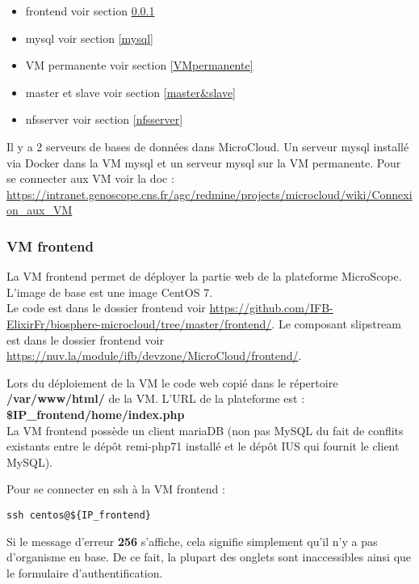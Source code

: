 \begin{itemize}
	\item frontend voir section \ref{frontend}
	\item mysql voir section \ref{mysql}
	\item VM permanente voir section \ref{VMpermanente}
	\item master et slave voir section \ref{master&slave}
	\item nfsserver voir section \ref{nfsserver}

\end{itemize}
Il y a 2 serveurs de bases de données dans MicroCloud. Un serveur mysql installé via Docker dans la VM mysql et un serveur mysql sur la VM permanente. Pour se connecter aux VM voir la doc : \url{https://intranet.genoscope.cns.fr/agc/redmine/projects/microcloud/wiki/Connexion_aux_VM}

\subsubsection {VM frontend}

\label{frontend} La VM frontend permet de déployer la partie web de la plateforme MicroScope. L'image de base est une image CentOS 7.\\
Le code est dans le dossier frontend voir \url{https://github.com/IFB-ElixirFr/biosphere-microcloud/tree/master/frontend/}.
Le composant slipstream est dans le dossier frontend voir \url{https://nuv.la/module/ifb/devzone/MicroCloud/frontend/}.

Lors du déploiement de la VM le code web copié dans le répertoire \textbf{/var/www/html/} de la VM.
L'URL de la plateforme est : \textbf{\$IP\_frontend/home/index.php}\\
La VM frontend possède un client mariaDB (non pas MySQL du fait de conflits existants entre le dépôt remi-php71 installé et le dépôt IUS qui fournit le client MySQL).
\newline

Pour se connecter en ssh à la VM frontend : 
\begin{lstlisting}[style=Bash]
ssh centos@${IP_frontend}
\end{lstlisting}

\begin{mycolorbox}Si le message d’erreur \textbf{256} s’affiche, cela signifie simplement qu’il n’y a pas d’organisme en base. De ce fait, la plupart des onglets sont inaccessibles ainsi que le formulaire d’authentification.
\end{mycolorbox}


